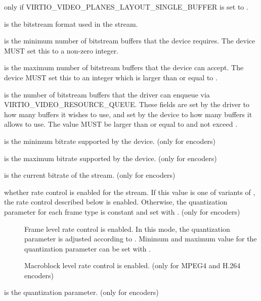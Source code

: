 \begin{description}
\begin{description}
\begin{description}
  only if VIRTIO_VIDEO_PLANES_LAYOUT_SINGLE_BUFFER is set to
  .
\end{description}
\item[\field{bitstream_format}] is the bitstream format used in the
  stream.
\item[\field{min_bitstream_buffers}] is the minimum number of bitstream buffers
  that the device requires. The device MUST set this to a non-zero integer.
\item[\field{max_bitstream_buffers}] is the maximum number of bitstream buffers
  that the device can accept. The device MUST set this to an integer which is
  larger than or equal to .
\item[\field{cur_bitstream_buffers}] is the number of bitstream buffers that the
  driver can enqueue via VIRTIO_VIDEO_RESOURCE_QUEUE. These fields are set by
  the driver to how many buffers it wishes to use, and set by the device to how
  many buffers it allows to use. The value MUST be larger than or equal to
   and not exceed .
\item[\field{min_bitrate}] is the minimum bitrate supported by the
  device. (only for encoders)
\item[\field{max_bitrate}] is the maximum bitrate supported by the
  device. (only for encoders)
\item[\field{cur_bitrate}] is the current bitrate of the stream. (only for
  encoders)
\item[\field{rc_mode}] whether rate control is enabled for the stream. If
  this value is one of variants of , the
  rate control described below is enabled. Otherwise, the quantization parameter
  for each frame type is constant and set with . (only for
  encoders)
  \begin{description}
  \item[] Frame level rate control is
    enabled. In this mode, the quantization parameter is adjusted according to
    . Minimum and maximum value for the quantization
    parameter can be set with .
  \item[] Macroblock level rate
    control is enabled. (only for MPEG4 and H.264 encoders)
  \end{description}
\item[\field{qp}] is the quantization parameter. (only for encoders)
\end{description}


\end{description}
